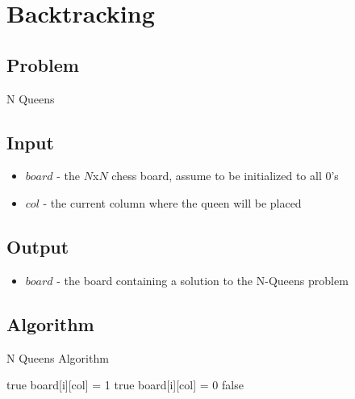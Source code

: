 \documentclass[12pt]{article}%
\begin{document}
\section{Backtracking}
  \subsection{Problem}
    N Queens
  \subsection{Input}
    \begin{itemize}
      \item $board$ - the $N$x$N$ chess board, assume to be initialized to all $0$'s 
      \item $col$ - the current column where the queen will be placed
    \end{itemize}
  \subsection{Output}
    \begin{itemize}
      \item $board$ - the board containing a solution to the N-Queens problem 
    \end{itemize}
  \subsection{Algorithm \cite{gfg_nq}}
    \begin{algorithm}
        \caption{N Queens Algorithm}\label{nq}
        \begin{algorithmic}[1]
              \State \Return true
            \EndIf 
                \State board[i][col] = 1
                  \State \Return true 
                \EndIf 
                \State board[i][col] = 0
              \EndIf
            \EndFor
            \State \Return false
        \EndFunction
        \end{algorithmic}
      \end{algorithm}
\end{document}
